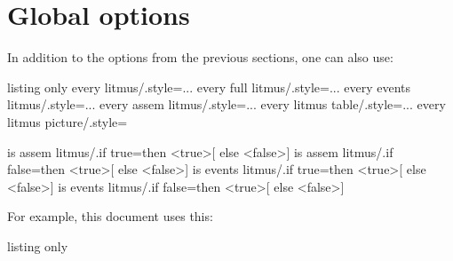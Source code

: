 \documentclass[a4paper]{article}
\begin{document}
\section{Global options}\label{sec:global}

In addition to the options from the previous sections, one can also use:
\begin{tcblisting}{listing only}
every litmus/.style={...}
every full litmus/.style={...}
every events litmus/.style={...}
every assem litmus/.style={...}
every litmus table/.style={...}
every litmus picture/.style=

is assem litmus/.if true=then {<true>}[ else {<false>}]
is assem litmus/.if false=then {<true>}[ else {<false>}]
is events litmus/.if true=then {<true>}[ else {<false>}]
is events litmus/.if false=then {<true>}[ else {<false>}]
\end{tcblisting}

For example, this document uses this:
\begin{tcblisting}{listing only}
\newif\ifdrawbox
{}
\end{tcblisting}

\newif\ifdrawbox
{}
\end{document}
